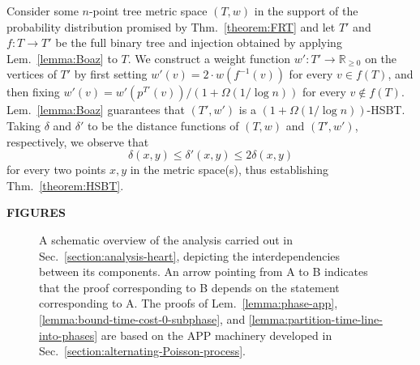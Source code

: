 \documentclass[11pt]{article}
\def\LongVersionEnd{}
\def\ShortVersion{}
\def\ShortVersionEnd{}
\theoremstyle{definition}
\theoremstyle{plain}
\theoremstyle{definition}
\theoremstyle{plain}
\theoremstyle{definition}
\theoremstyle{plain}
\newcommand{\Sect}{Sec.}
\newcommand{\Thm}{Thm.}
\newcommand{\Lem}{Lem.}
\newcommand{\Reals}{\mathbb{R}}
\begin{document}
Consider some $n$-point tree metric space $(T, w)$ in the support of the
probability distribution promised by \Thm{}~\ref{theorem:FRT} and let $T'$ and
$f : T \rightarrow T'$
be the full binary tree and injection obtained by applying
\Lem{}~\ref{lemma:Boaz} to $T$.
We construct a weight function
$w' : T' \rightarrow \Reals_{\geq 0}$
on the vertices of $T'$ by first setting
$w'(v) = 2 \cdot w(f^{-1}(v))$
for every
$v \in f(T)$,
and then fixing
$w'(v) = w'(p^{T'}(v)) / (1 + \Omega (1 / \log n))$
for every
$v \notin f(T)$.
\Lem{}~\ref{lemma:Boaz} guarantees that
$(T', w')$ is a $(1 + \Omega (1 / \log n))$-HSBT.
Taking $\delta$ and $\delta'$ to be the distance functions of $(T, w)$ and
$(T', w')$, respectively, we observe that
\[
\delta(x, y)
\leq
\delta'(x, y)
\leq
2 \delta(x, y)
\]
for every two points $x, y$ in the metric space(s), thus establishing
\Thm{}~\ref{theorem:HSBT}.

\LongVersionEnd %

\clearpage
\renewcommand{\thepage}{}

\ShortVersion %

\begin{center}
\textbf{\large{FIGURES}}
\end{center}

\PseudocodeStiltWalker{}

\FigureApp{}


\FigureSubphaseApp{}



\ShortVersionEnd %

\begin{figure}[h]
\begin{figure}[omitted: a diagram of this paper's results, not reproduced here]\end{figure}
\caption{\label{figure:claim-chart}
A schematic overview of the analysis carried out in
\Sect{}~\ref{section:analysis-heart}, depicting the interdependencies between
its components.
An arrow pointing from A to B indicates that the proof corresponding
to B depends on the statement corresponding to A.
The proofs of \Lem{}\ \ref{lemma:phase-app},
\ref{lemma:bound-time-cost-0-subphase}, and
\ref{lemma:partition-time-line-into-phases} are based on the APP machinery
developed in \Sect{}~\ref{section:alternating-Poisson-process}.
}
\end{figure}
\end{document}
